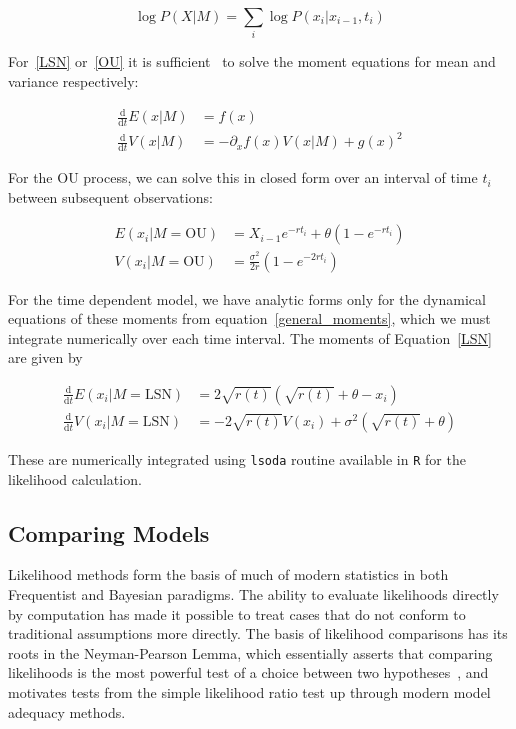 \documentclass[authoryear,review,11pt]{elsarticle}
\newcommand{\ud}{\mathrm{d}}
\begin{document}
\begin{equation}
\log P(X | M)=  \sum_i \log P(x_i | x_{i-1}, t_i)
\end{equation}

For~\eqref{LSN} or~\eqref{OU} it is sufficient~\citep{Gardiner2009} to solve the moment equations for mean and variance respectively:

\begin{align}
 \frac{\ud }{\ud t} E(x| M)&=  f(x) \\
\frac{\ud}{\ud t} V(x| M) &=  -\partial_x f(x) V(x|M) + g(x)^2
  \label{general_moments}
\end{align}

For the OU process, we can solve this in closed form over an interval of time $t_i$ between subsequent observations:

\begin{align}
  E(x_i| M = \text{OU}) &= X_{i-1} e^{-r t_i} + \theta \left(1 - e^{-rt_i} \right) \\
V(x_i| M = \text{OU}) &= \frac{\sigma^2}{2 r} \left(1 - e^{-2 r t_i} \right)
\label{OUsoln}
\end{align}

For the time dependent model, we have analytic forms only for the dynamical equations of these moments from equation~\eqref{general_moments}, which we must integrate numerically over each time interval.
The moments of Equation~\eqref{LSN} are given by

\begin{align}
\frac{\ud }{\ud t} E(x_i| M = \text{LSN})&=  2\sqrt{r(t)}(\sqrt{r(t)}+\theta - x_i) \\
\frac{\ud}{\ud t} V(x_i| M = \text{LSN}) &=  -2 \sqrt{r(t)} V(x_i) + \sigma^2 ( \sqrt{r(t)}+\theta )
\label{LSNsoln}
\end{align}

These are numerically integrated using \texttt{lsoda} routine available in \texttt{R} for the likelihood calculation.

\subsection*{Comparing Models}
Likelihood methods form the basis of much of modern statistics
in both Frequentist and Bayesian paradigms.
The ability to evaluate likelihoods directly by computation has made it
possible to treat cases that do not conform to traditional assumptions more directly.
The basis of likelihood comparisons has its roots in the Neyman-Pearson Lemma,
which essentially asserts that comparing likelihoods is the most powerful test
of a choice between two hypotheses~\citep{Neyman1933}, and motivates
tests from the simple likelihood ratio test up through modern model adequacy methods.
\end{document}
